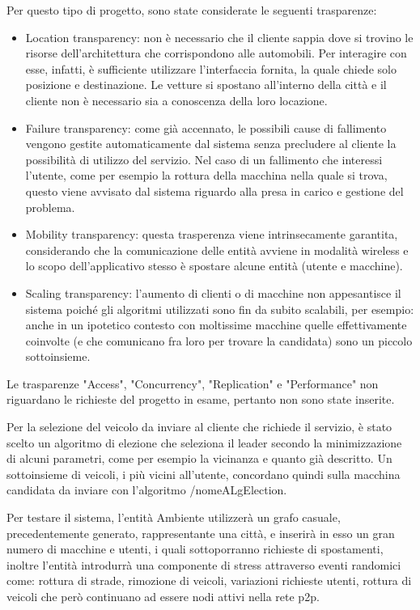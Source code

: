 Per questo tipo di progetto, sono state considerate le seguenti trasparenze: 
\begin{itemize}
	\item Location transparency: non è necessario che il cliente sappia dove si trovino le risorse dell'architettura che corrispondono alle automobili. Per interagire con esse, infatti, è sufficiente utilizzare l'interfaccia fornita, la quale chiede solo posizione e destinazione. Le vetture si spostano all'interno della città e il cliente non è necessario sia a conoscenza della loro locazione.
	\item Failure transparency: come già accennato, le possibili cause di fallimento vengono gestite automaticamente dal sistema senza precludere al cliente la possibilità di utilizzo del servizio. Nel caso di un fallimento che interessi l'utente, come per esempio la rottura della macchina nella quale si trova, questo viene avvisato dal sistema riguardo alla presa in carico e gestione del problema.
	\item Mobility transparency: questa trasperenza viene intrinsecamente garantita, considerando che la comunicazione delle entità avviene in modalità wireless e lo scopo dell'applicativo stesso è spostare alcune entità (utente e macchine).
	\item Scaling transparency: l'aumento di clienti o di macchine non appesantisce il sistema poiché gli algoritmi utilizzati sono fin da subito scalabili, per esempio: anche in un ipotetico contesto con moltissime macchine quelle effettivamente coinvolte (e che comunicano fra loro per trovare la candidata) sono un piccolo sottoinsieme. 
\end{itemize}

Le trasparenze "Access", "Concurrency", "Replication" e "Performance" non riguardano le richieste del progetto in esame, pertanto non sono state inserite.

Per la selezione del veicolo da inviare al cliente che richiede il servizio, è stato scelto un algoritmo di elezione che seleziona il leader secondo la minimizzazione di alcuni parametri, come per esempio la vicinanza e quanto già descritto. Un sottoinsieme di veicoli, i più vicini all'utente, concordano quindi sulla macchina candidata da inviare con l'algoritmo /nomeALgElection.

Per testare il sistema, l'entità Ambiente utilizzerà un grafo casuale, precedentemente generato, rappresentante una città, e inserirà in esso un gran numero di macchine e utenti, i quali sottoporranno richieste di spostamenti, inoltre l'entità introdurrà una componente di stress attraverso eventi randomici come: rottura di strade, rimozione di veicoli, variazioni richieste utenti, rottura di veicoli che però continuano ad essere nodi attivi nella rete p2p. 

